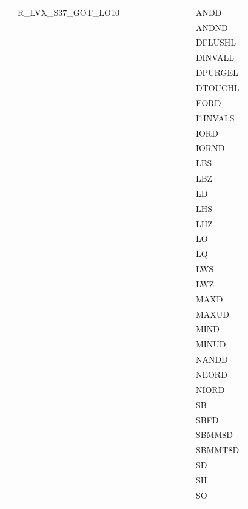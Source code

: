 {\begin{tabular}{|l|l|l|l|l|l|l|l|l|l|l|}
 & \textsf{R\_LVX\_S37\_GOT\_LO10} & & & & & & & & & \textsf{ANDD} \\
 & & & & & & & & & & \textsf{ANDND} \\
 & & & & & & & & & & \textsf{DFLUSHL} \\
 & & & & & & & & & & \textsf{DINVALL} \\
 & & & & & & & & & & \textsf{DPURGEL} \\
 & & & & & & & & & & \textsf{DTOUCHL} \\
 & & & & & & & & & & \textsf{EORD} \\
 & & & & & & & & & & \textsf{I1INVALS} \\
 & & & & & & & & & & \textsf{IORD} \\
 & & & & & & & & & & \textsf{IORND} \\
 & & & & & & & & & & \textsf{LBS} \\
 & & & & & & & & & & \textsf{LBZ} \\
 & & & & & & & & & & \textsf{LD} \\
 & & & & & & & & & & \textsf{LHS} \\
 & & & & & & & & & & \textsf{LHZ} \\
 & & & & & & & & & & \textsf{LO} \\
 & & & & & & & & & & \textsf{LQ} \\
 & & & & & & & & & & \textsf{LWS} \\
 & & & & & & & & & & \textsf{LWZ} \\
 & & & & & & & & & & \textsf{MAXD} \\
 & & & & & & & & & & \textsf{MAXUD} \\
 & & & & & & & & & & \textsf{MIND} \\
 & & & & & & & & & & \textsf{MINUD} \\
 & & & & & & & & & & \textsf{NANDD} \\
 & & & & & & & & & & \textsf{NEORD} \\
 & & & & & & & & & & \textsf{NIORD} \\
 & & & & & & & & & & \textsf{SB} \\
 & & & & & & & & & & \textsf{SBFD} \\
 & & & & & & & & & & \textsf{SBMM8D} \\
 & & & & & & & & & & \textsf{SBMMT8D} \\
 & & & & & & & & & & \textsf{SD} \\
 & & & & & & & & & & \textsf{SH} \\
 & & & & & & & & & & \textsf{SO} \\

\end{tabular}}

